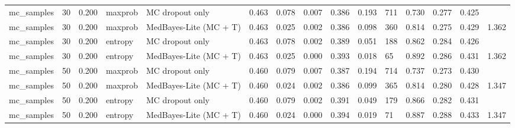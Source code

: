 \begin{table}[htbp]
\begin{tabular}{lllllllllllllll}
mc\_samples & 30 & 0.200 & maxprob & MC dropout only & 0.463 & 0.078 & 0.007 & 0.386 & 0.193 & 711 & 0.730 & 0.277 & 0.425 &  \\
mc\_samples & 30 & 0.200 & maxprob & MedBayes-Lite (MC + T) & 0.463 & 0.025 & 0.002 & 0.386 & 0.098 & 360 & 0.814 & 0.275 & 0.429 & 1.362 \\
mc\_samples & 30 & 0.200 & entropy & MC dropout only & 0.463 & 0.078 & 0.002 & 0.389 & 0.051 & 188 & 0.862 & 0.284 & 0.426 &  \\
mc\_samples & 30 & 0.200 & entropy & MedBayes-Lite (MC + T) & 0.463 & 0.025 & 0.000 & 0.393 & 0.018 & 65 & 0.892 & 0.286 & 0.431 & 1.362 \\
mc\_samples & 50 & 0.200 & maxprob & MC dropout only & 0.460 & 0.079 & 0.007 & 0.387 & 0.194 & 714 & 0.737 & 0.273 & 0.430 &  \\
mc\_samples & 50 & 0.200 & maxprob & MedBayes-Lite (MC + T) & 0.460 & 0.024 & 0.002 & 0.386 & 0.099 & 365 & 0.814 & 0.280 & 0.428 & 1.347 \\
mc\_samples & 50 & 0.200 & entropy & MC dropout only & 0.460 & 0.079 & 0.002 & 0.391 & 0.049 & 179 & 0.866 & 0.282 & 0.431 &  \\
mc\_samples & 50 & 0.200 & entropy & MedBayes-Lite (MC + T) & 0.460 & 0.024 & 0.000 & 0.394 & 0.019 & 71 & 0.887 & 0.288 & 0.433 & 1.347 \\
\bottomrule
\end{tabular}
\end{table}
